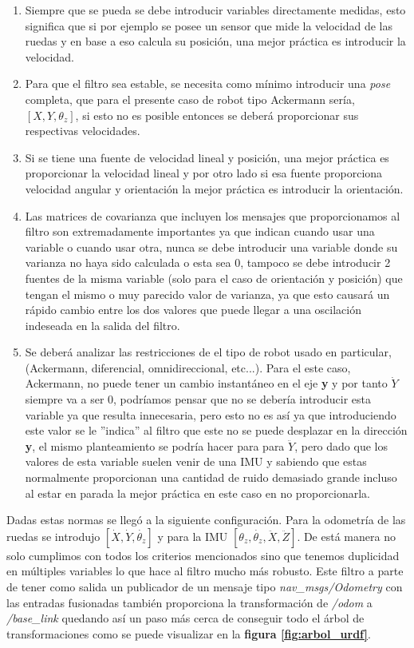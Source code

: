 \begin{enumerate}
    \item Siempre que se pueda se debe introducir variables directamente medidas, esto significa que si por ejemplo se posee un sensor que 
mide la velocidad de las ruedas y en base a eso calcula su posición, una mejor práctica es introducir la velocidad.
    \item Para que el filtro sea estable, se necesita como mínimo introducir una \textit{pose} completa, que para el presente caso de robot tipo Ackermann 
sería, $[ X,Y,\theta_{z}]$, si esto no es posible entonces se deberá proporcionar sus respectivas velocidades.
    \item Si se tiene una fuente de velocidad lineal y posición, una mejor práctica es proporcionar la velocidad lineal y por otro lado si 
esa fuente proporciona velocidad angular y orientación la mejor práctica es introducir la orientación.
    \item Las matrices de covarianza que incluyen los mensajes que proporcionamos al filtro son extremadamente importantes ya que indican 
cuando usar una variable o cuando usar otra, nunca se debe introducir una variable donde su varianza no haya sido calculada o esta sea 0, 
tampoco se debe introducir 2 fuentes de la misma variable (solo para el caso de orientación y posición) que tengan el mismo o muy parecido 
valor de varianza, ya que esto causará un rápido cambio entre los dos valores que puede llegar a una oscilación indeseada en la salida del 
filtro.
    \item Se deberá analizar las restricciones de el tipo de robot usado en particular, (Ackermann, diferencial, omnidireccional, etc...). 
Para el este caso, Ackermann, no puede tener un cambio instantáneo en el eje \textbf{y} y por tanto $\dot{Y}$ siempre va 
a ser 0, podríamos pensar que no se debería introducir esta variable ya que resulta innecesaria, pero esto no es así ya que introduciendo este valor se le 
''indica'' al filtro que este no se puede desplazar en la dirección \textbf{y}, el mismo planteamiento se podría hacer para para $\ddot{Y}$, pero dado que los 
valores de esta variable suelen venir de una IMU y sabiendo que estas normalmente proporcionan una cantidad de ruido demasiado grande incluso al estar en parada la 
mejor práctica en este caso en no proporcionarla.
\end{enumerate}

Dadas estas normas se llegó a la siguiente configuración. Para la odometría de las ruedas se introdujo 
$[ \dot{X},\dot{Y},\dot{\theta_{z}} ]$ y para la IMU $[ \theta_{z},\dot{\theta_{z}},\ddot{X},\ddot{Z} ]$. De está manera no solo cumplimos 
con todos los criterios mencionados sino que tenemos duplicidad en múltiples variables lo que hace al filtro mucho más robusto. Este filtro 
a parte de tener como salida un publicador de un mensaje tipo \textit{nav\_msgs/Odometry} con las entradas fusionadas también 
proporciona la transformación de \textit{/odom} a \textit{/base\_link} quedando así un paso más cerca de conseguir todo el árbol de 
transformaciones como se puede visualizar en la \textbf{figura \ref{fig:arbol_urdf}}.


